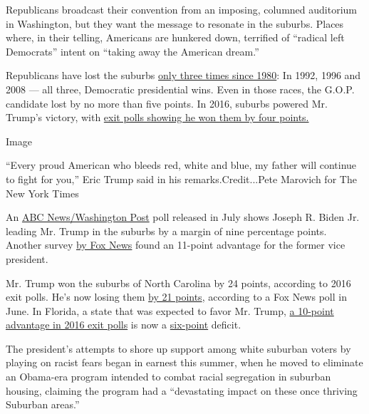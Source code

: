 Republicans broadcast their convention from an imposing, columned
auditorium in Washington, but they want the message to resonate in the
suburbs. Places where, in their telling, Americans are hunkered down,
terrified of ``radical left Democrats'' intent on ``taking away the
American dream.''

Republicans have lost the suburbs
\href{https://www.nytimes3xbfgragh.onion/elections/2008/results/president/national-exit-polls.html}{only
three times since 1980}: In 1992, 1996 and 2008 --- all three,
Democratic presidential wins. Even in those races, the G.O.P. candidate
lost by no more than five points. In 2016, suburbs powered Mr. Trump's
victory, with
\href{https://www.cnn.com/election/2016/results/exit-polls}{exit polls
showing he won them by four points.}

Image

``Every proud American who bleeds red, white and blue, my father will
continue to fight for you,'' Eric Trump said in his
remarks.Credit...Pete Marovich for The New York Times

An
\href{https://www.langerresearch.com/wp-content/uploads/1214a22020Election.pdf}{ABC
News/Washington Post} poll released in July shows Joseph R. Biden Jr.
leading Mr. Trump in the suburbs by a margin of nine percentage points.
Another survey
\href{https://www.foxnews.com/politics/fox-news-poll-biden-holds-lead-over-trump-as-coronavirus-concerns-grip-nation}{by
Fox News} found an 11-point advantage for the former vice president.

Mr. Trump won the suburbs of North Carolina by 24 points, according to
2016 exit polls. He's now losing them
\href{https://static.foxnews.com/foxnews.com/content/uploads/2020/06/Fox_June-20-23-2020_Complete_North-Carolina_Topline_June-25-Release.pdf}{by
21 points}, according to a Fox News poll in June. In Florida, a state
that was expected to favor Mr. Trump,
\href{https://www.cnn.com/election/2016/results/exit-polls/florida/president}{a
10-point advantage in 2016 exit polls} is now a
\href{https://static.foxnews.com/foxnews.com/content/uploads/2020/06/Fox_June-20-23-2020_Complete_Florida_Topline_June-25-Release.pdf}{six-point}
deficit.

The president's attempts to shore up support among white suburban voters
by playing on racist fears began in earnest this summer, when he moved
to eliminate an Obama-era program intended to combat racial segregation
in suburban housing, claiming the program had a ``devastating impact on
these once thriving Suburban areas.''

